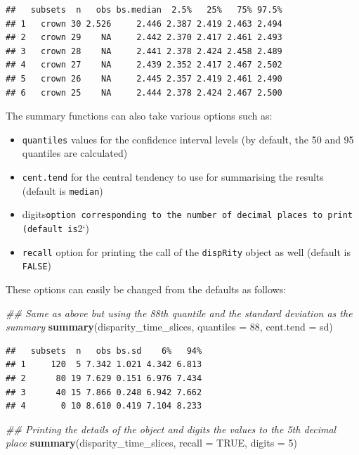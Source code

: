 \documentclass[]{book}
\newenvironment{Shaded}{\begin{snugshade}}{\end{snugshade}}
\newcommand{\CommentTok}[1]{\textcolor[rgb]{0.56,0.35,0.01}{\textit{#1}}}
\newcommand{\DataTypeTok}[1]{\textcolor[rgb]{0.13,0.29,0.53}{#1}}
\newcommand{\DecValTok}[1]{\textcolor[rgb]{0.00,0.00,0.81}{#1}}
\newcommand{\KeywordTok}[1]{\textcolor[rgb]{0.13,0.29,0.53}{\textbf{#1}}}
\newcommand{\NormalTok}[1]{#1}
\newcommand{\OtherTok}[1]{\textcolor[rgb]{0.56,0.35,0.01}{#1}}
\providecommand{\tightlist}{%
  \setlength{\itemsep}{0pt}\setlength{\parskip}{0pt}}
\begin{document}
\begin{verbatim}
##   subsets  n   obs bs.median  2.5%   25%   75% 97.5%
## 1   crown 30 2.526     2.446 2.387 2.419 2.463 2.494
## 2   crown 29    NA     2.442 2.370 2.417 2.461 2.493
## 3   crown 28    NA     2.441 2.378 2.424 2.458 2.489
## 4   crown 27    NA     2.439 2.352 2.417 2.467 2.502
## 5   crown 26    NA     2.445 2.357 2.419 2.461 2.490
## 6   crown 25    NA     2.444 2.378 2.424 2.467 2.500
\end{verbatim}

The summary functions can also take various options such as:

\begin{itemize}
\tightlist
\item
  \texttt{quantiles} values for the confidence interval levels (by default, the 50 and 95 quantiles are calculated)
\item
  \texttt{cent.tend} for the central tendency to use for summarising the results (default is \texttt{median})
\item
  digits\texttt{option\ corresponding\ to\ the\ number\ of\ decimal\ places\ to\ print\ (default\ is}2`)
\item
  \texttt{recall} option for printing the call of the \texttt{dispRity} object as well (default is \texttt{FALSE})
\end{itemize}

These options can easily be changed from the defaults as follows:

\begin{Shaded}
\begin{Highlighting}[]
\CommentTok{## Same as above but using the 88th quantile and the standard deviation as the summary }
\KeywordTok{summary}\NormalTok{(disparity_time_slices, }\DataTypeTok{quantiles =} \DecValTok{88}\NormalTok{, }\DataTypeTok{cent.tend =}\NormalTok{ sd)}
\end{Highlighting}
\end{Shaded}

\begin{verbatim}
##   subsets  n   obs bs.sd    6%   94%
## 1     120  5 7.342 1.021 4.342 6.813
## 2      80 19 7.629 0.151 6.976 7.434
## 3      40 15 7.866 0.248 6.942 7.662
## 4       0 10 8.610 0.419 7.104 8.233
\end{verbatim}

\begin{Shaded}
\begin{Highlighting}[]
\CommentTok{## Printing the details of the object and digits the values to the 5th decimal place}
\KeywordTok{summary}\NormalTok{(disparity_time_slices, }\DataTypeTok{recall =} \OtherTok{TRUE}\NormalTok{, }\DataTypeTok{digits =} \DecValTok{5}\NormalTok{)}
\end{Highlighting}
\end{Shaded}
\end{document}

